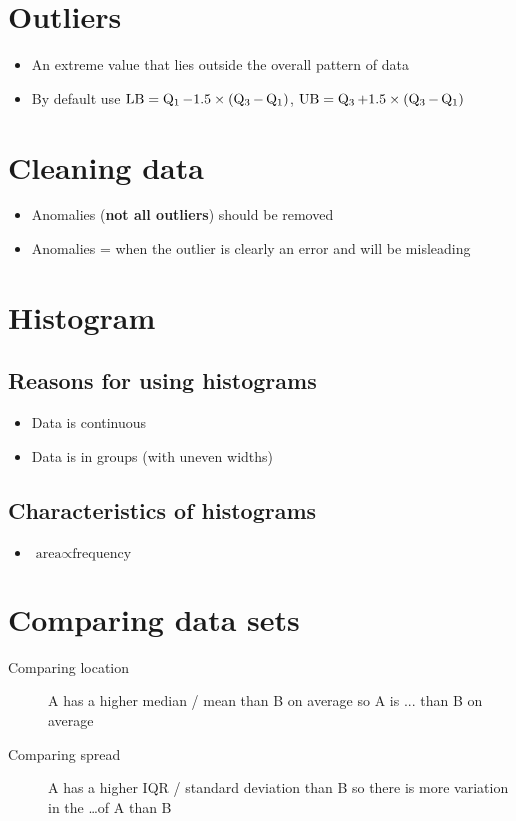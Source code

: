 \section{Outliers}
\begin{itemize}
	\item An extreme value that lies outside the overall pattern of data
	\item By default use $\text{LB} = \operatorname{Q_1} - 1.5\times(\operatorname{Q_3}-\operatorname{Q_1})$, $\text{UB} = \operatorname{Q_3} + 1.5\times(\operatorname{Q_3}-\operatorname{Q_1})$
\end{itemize}

\section{Cleaning data}
\begin{itemize}
	\item Anomalies (\textbf{not all outliers}) should be removed
	\item Anomalies = when the outlier is clearly an error and will be misleading
\end{itemize}


\section{Histogram}
\subsection{Reasons for using histograms}
\begin{itemize}
	\item Data is continuous
	\item Data is in groups (with uneven widths)
\end{itemize}
\subsection{Characteristics of histograms}
\begin{itemize}
	\item $\text{area}\propto\text{frequency}$
\end{itemize}

\section{Comparing data sets}
\begin{description}
	\item[Comparing location] A has a higher median / mean than B on average so A is ... than B on average
	\item[Comparing spread] A has a higher IQR / standard deviation than B so there is more variation in the \dots of A than B
\end{description}